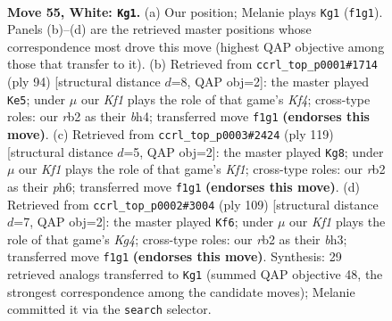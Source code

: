 \documentclass[11pt]{article}
\begin{document}
\clearpage

\begin{figure}[p]\centering
\begin{subfigure}{0.46\textwidth}\centering
\resizebox{\linewidth}{!}{%
\newchessgame
\chessboard[
  setfen={3k4/8/8/4p1p1/5p2/5B2/1r6/5K2 w - - 21 55},
  showmover=false,
  pgfstyle=straightmove, color=movearrow, markmove={f1-g1}
]}
\caption{}
\end{subfigure}\hfill
\begin{subfigure}{0.46\textwidth}\centering
\resizebox{\linewidth}{!}{%
\newchessgame
\chessboard[
  setfen={6k1/8/8/1p6/2p2K1b/2B5/8/8 w - - 0 48},
  showmover=false,
  pgfstyle=straightmove, color=movearrow, markmove={f4-e5}
]}
\caption{}
\end{subfigure}
\\[4pt]
\begin{subfigure}{0.46\textwidth}\centering
\resizebox{\linewidth}{!}{%
\newchessgame
\chessboard[
  setfen={5k2/8/4K2P/6P1/5P2/8/1b6/8 b - - 0 60},
  showmover=false,
  pgfstyle=straightmove, color=movearrow, markmove={f8-g8}
]}
\caption{}
\end{subfigure}\hfill
\begin{subfigure}{0.46\textwidth}\centering
\resizebox{\linewidth}{!}{%
\newchessgame
\chessboard[
  setfen={8/8/1b1p4/1P1P2k1/2P5/5K1B/8/8 b - - 0 55},
  showmover=false,
  pgfstyle=straightmove, color=movearrow, markmove={g5-f6}
]}
\caption{}
\end{subfigure}
\caption{\textbf{Move 55, White: \texttt{Kg1}.} (a) Our position; Melanie plays \texttt{Kg1} (\texttt{f1g1}). Panels (b)--(d) are the retrieved master positions whose correspondence most drove this move (highest QAP objective among those that transfer to it). (b) Retrieved from \texttt{ccrl\_top\_p0001\#1714} (ply 94) [structural distance $d$=8, QAP obj=2]: the master played \texttt{Ke5}; under $\mu$ our \emph{Kf1} plays the role of that game's \emph{Kf4}; cross-type roles: our \emph{r}b2 as their \emph{b}h4; transferred move \texttt{f1g1} \textbf{(endorses this move)}. (c) Retrieved from \texttt{ccrl\_top\_p0003\#2424} (ply 119) [structural distance $d$=5, QAP obj=2]: the master played \texttt{Kg8}; under $\mu$ our \emph{Kf1} plays the role of that game's \emph{Kf1}; cross-type roles: our \emph{r}b2 as their \emph{p}h6; transferred move \texttt{f1g1} \textbf{(endorses this move)}. (d) Retrieved from \texttt{ccrl\_top\_p0002\#3004} (ply 109) [structural distance $d$=7, QAP obj=2]: the master played \texttt{Kf6}; under $\mu$ our \emph{Kf1} plays the role of that game's \emph{Kg4}; cross-type roles: our \emph{r}b2 as their \emph{b}h3; transferred move \texttt{f1g1} \textbf{(endorses this move)}. Synthesis: 29 retrieved analogs transferred to \texttt{Kg1} (summed QAP objective 48, the strongest correspondence among the candidate moves); Melanie committed it via the \texttt{search} selector.}
\label{fig:thought-m108}
\end{figure}
\end{document}
